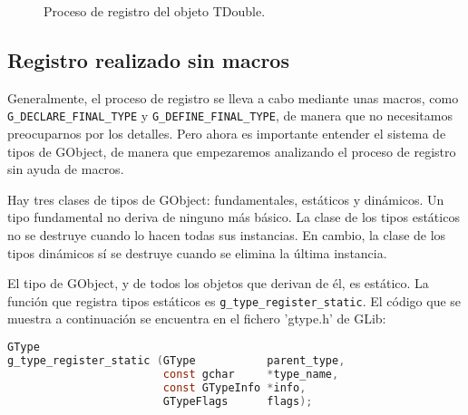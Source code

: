\begin{figure}[ht]
 \caption{Proceso de registro del objeto \textsf{TDouble}.}
 \label{fig:proceso-registro}
\end{figure}

\subsection{Registro realizado sin macros}
Generalmente, el proceso de registro se lleva a cabo mediante unas macros, como
\texttt{G\_DECLARE\_FINAL\_TYPE} y \texttt{G\_DEFINE\_FINAL\_TYPE}, de manera que no
necesitamos preocuparnos por los detalles. Pero ahora es importante entender el
sistema de tipos de \textsf{GObject}, de manera que empezaremos analizando el proceso
de registro sin ayuda de macros.

Hay tres clases de tipos de \textsf{GObject}: fundamentales, estáticos y dinámicos.
Un tipo fundamental no deriva de ninguno más básico.
La clase de los tipos estáticos no se destruye cuando lo hacen todas sus instancias.
En cambio, la clase de los tipos dinámicos sí se destruye cuando se elimina la última instancia.

El tipo de \textsf{GObject}, y de todos los objetos que derivan de él, es estático.
La función que registra tipos estáticos es \texttt{g\_type\_register\_static}.
El código que se muestra a continuación se encuentra en el fichero '\textsf{gtype.h}' de
\textsf{GLib}:
\begin{lstlisting}[language=C]
GType
g_type_register_static (GType           parent_type,
                        const gchar     *type_name,
                        const GTypeInfo *info,
                        GTypeFlags      flags);
\end{lstlisting}

